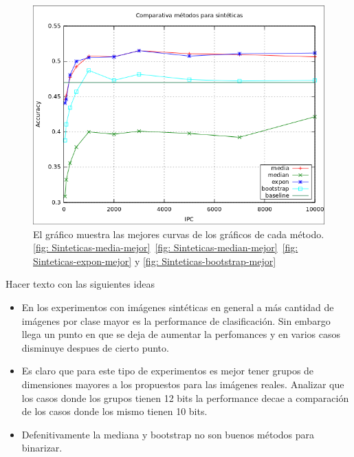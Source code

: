 			\begin{figure}[htbp]
				\centering
				\includegraphics[scale=0.6]{img/resultados/sinteticas/comparativa_metodos.png}
				\caption[Sintéticas comparativa métodos]{El gráfico muestra las mejores curvas de los gráficos de cada método. \ref{fig: Sinteticas-media-mejor}~\ref{fig: Sinteticas-median-mejor}~\ref{fig: Sinteticas-expon-mejor} y \ref{fig: Sinteticas-bootstrap-mejor}}
				\label{fig: Sinteticas-comparativa metodos}
			\end{figure}

\newpage

	Hacer texto con las siguientes ideas
	\begin{itemize}
		\item En los experimentos con imágenes sintéticas en general a más cantidad de imágenes por clase mayor es la performance de clasificación. Sin embargo llega un punto en que se deja de aumentar la perfomances y en varios casos disminuye despues de cierto punto.
		\item Es claro que para este tipo de experimentos es mejor tener grupos de dimensiones mayores a los propuestos para las imágenes reales. Analizar que los casos donde los grupos tienen 12 bits la performance decae a comparación de los casos donde los mismo tienen 10 bits.
		\item Defenitivamente la mediana y bootstrap no son buenos métodos para binarizar.
	\end{itemize}

